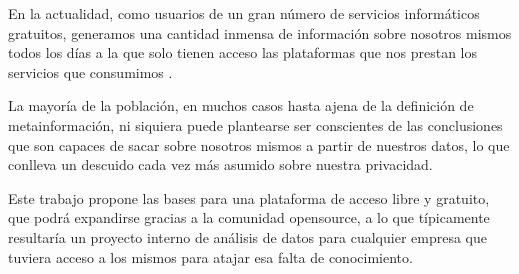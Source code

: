 
En la actualidad, como usuarios de un gran número de servicios informáticos gratuitos, generamos una cantidad inmensa de información sobre nosotros mismos todos los días a la que solo tienen acceso las plataformas que nos prestan los servicios que consumimos \cite{DailyData}.

La mayoría de la población, en muchos casos hasta ajena de la definición de metainformación, ni siquiera puede plantearse ser conscientes de las conclusiones que son capaces de sacar sobre nosotros mismos a partir de nuestros datos, lo que conlleva un descuido cada vez más asumido sobre nuestra privacidad.

Este trabajo propone las bases para una plataforma de acceso libre y gratuito, que podrá expandirse gracias a la comunidad opensource, a lo que típicamente resultaría un proyecto interno de análisis de datos para cualquier empresa que tuviera acceso a los mismos para atajar esa falta de conocimiento.
